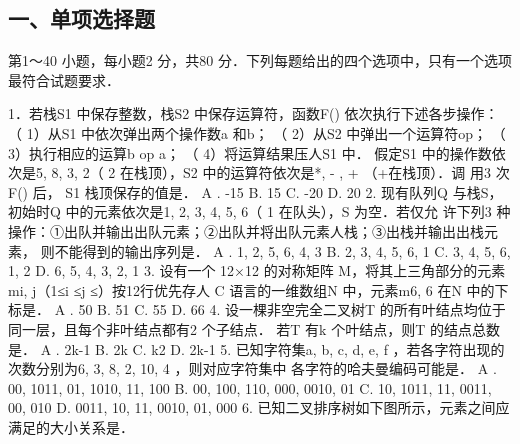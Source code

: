 
\subsection{一、单项选择题}
第1～40 小题，每小题2 分，共80 分．下列每题给出的四个选项中，只有一个选项最符合试题要求．

1．若栈S1 中保存整数，栈S2 中保存运算符，函数F() 依次执行下述各步操作：
（ 1）从S1 中依次弹出两个操作数a 和b；
（ 2）从S2 中弹出一个运算符op；
（ 3）执行相应的运算b op a；
（ 4）将运算结果压人S1 中．
假定S1 中的操作数依次是5, 8, 3, 2（ 2 在栈顶），S2 中的运算符依次是*, - , + （+在栈顶）．调
用3 次F() 后， S1 栈顶保存的值是．
A . -15 B. 15 C. -20 D. 20
2. 现有队列Q 与栈S，初始时Q 中的元素依次是1, 2, 3, 4, 5, 6（ 1 在队头），S 为空．若仅允
许下列3 种操作：①出队并输出出队元素；②出队并将出队元素人栈；③出栈并输出出栈元素，
则不能得到的输出序列是．
A . 1, 2, 5, 6, 4, 3 B. 2, 3, 4, 5, 6, 1
C. 3, 4, 5, 6, 1, 2 D. 6, 5, 4, 3, 2, 1
3. 设有一个 12×12 的对称矩阵 M，将其上三角部分的元素 mi, j（1≤i ≤j ≤）按12行优先存人 C
语言的一维数组N 中，元素m6, 6 在N 中的下标是．
A . 50 B. 51 C. 55 D. 66
4. 设一棵非空完全二叉树T 的所有叶结点均位于同一层，且每个非叶结点都有2 个子结点．
若T 有k 个叶结点，则T 的结点总数是．
A . 2k-1 B. 2k C. k2 D. 2k-1
5. 已知字符集{a, b, c, d, e, f} ，若各字符出现的次数分别为6, 3, 8, 2, 10, 4 ，则对应字符集中
各字符的哈夫曼编码可能是．
A . 00, 1011, 01, 1010, 11, 100 B. 00, 100, 110, 000, 0010, 01
C. 10, 1011, 11, 0011, 00, 010 D. 0011, 10, 11, 0010, 01, 000
6. 已知二叉排序树如下图所示，元素之间应满足的大小关系是．